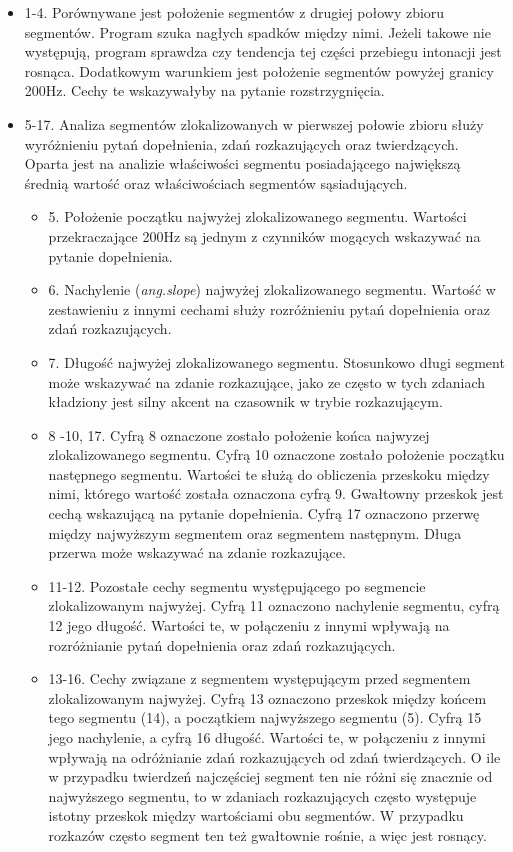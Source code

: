 \documentclass[a4paper,12 pt]{report}
\begin{document}
\begin{itemize}
\item{1-4. Porównywane jest położenie segmentów z drugiej połowy zbioru segmentów. Program szuka nagłych spadków między nimi. Jeżeli takowe nie występują, program sprawdza czy tendencja tej części przebiegu intonacji jest rosnąca. Dodatkowym warunkiem jest położenie segmentów powyżej granicy 200Hz. Cechy te wskazywałyby na pytanie rozstrzygnięcia.}
\item{5-17. Analiza segmentów zlokalizowanych w pierwszej połowie zbioru służy wyróżnieniu pytań dopełnienia, zdań rozkazujących oraz twierdzących. Oparta jest na analizie właściwości segmentu posiadającego największą średnią wartość oraz właściwościach segmentów sąsiadujących.
\begin{itemize}
\item{5. Położenie początku najwyżej zlokalizowanego segmentu. Wartości przekraczające 200Hz są jednym z czynników mogących wskazywać na pytanie dopełnienia.}
\item{6. Nachylenie (\textit{ang.slope}) najwyżej zlokalizowanego segmentu. Wartość w zestawieniu z innymi cechami służy rozróżnieniu pytań dopełnienia oraz zdań rozkazujących.}
\item{7. Długość najwyżej zlokalizowanego segmentu. Stosunkowo długi segment może wskazywać na zdanie rozkazujące, jako ze często w tych zdaniach kładziony jest silny akcent na czasownik w trybie rozkazującym.}
\item{8 -10, 17. Cyfrą 8 oznaczone zostało położenie końca najwyzej zlokalizowanego segmentu. Cyfrą 10 oznaczone zostało położenie początku następnego segmentu. Wartości te służą do obliczenia przeskoku między nimi, którego wartość została oznaczona cyfrą 9. Gwałtowny przeskok jest cechą wskazującą na pytanie dopełnienia. Cyfrą 17 oznaczono przerwę między najwyższym segmentem oraz segmentem następnym. Długa przerwa może wskazywać na zdanie rozkazujące. }
\item{11-12. Pozostałe cechy segmentu występującego po segmencie zlokalizowanym najwyżej. Cyfrą 11 oznaczono nachylenie segmentu, cyfrą 12 jego długość. Wartości te, w połączeniu z innymi wpływają na rozróżnianie pytań dopełnienia oraz zdań rozkazujących.}
\item{13-16. Cechy związane z segmentem występującym przed segmentem zlokalizowanym najwyżej. Cyfrą 13 oznaczono przeskok między końcem tego segmentu (14), a początkiem najwyższego segmentu (5). Cyfrą 15 jego nachylenie, a cyfrą 16 długość. Wartości te, w połączeniu z innymi wpływają na odróżnianie zdań rozkazujących od zdań twierdzących. O ile w przypadku twierdzeń najczęściej segment ten nie różni się znacznie od najwyższego segmentu, to w zdaniach rozkazujących często występuje istotny przeskok między wartościami obu segmentów. W przypadku rozkazów często segment ten też gwałtownie rośnie, a więc jest rosnący. }
\end{itemize}
}
\end{itemize}
\end{document}
